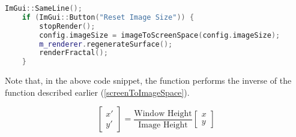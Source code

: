 \begin{lstlisting}[language=c++]
	ImGui::SameLine();
	if (ImGui::Button("Reset Image Size")) {
		stopRender();
		config.imageSize = imageToScreenSpace(config.imageSize);
		m_renderer.regenerateSurface();
		renderFractal();
	}
\end{lstlisting}

Note that, in the above code snippet, the  function performs the inverse of the  function described earlier (\ref{screenToImageSpace}).

\begin{equation*}
	\begin{bmatrix} x' \\ y' \end{bmatrix} = \frac{\text{Window Height}}{\text{Image Height}} \begin{bmatrix} x \\ y \end{bmatrix}
\end{equation*}
